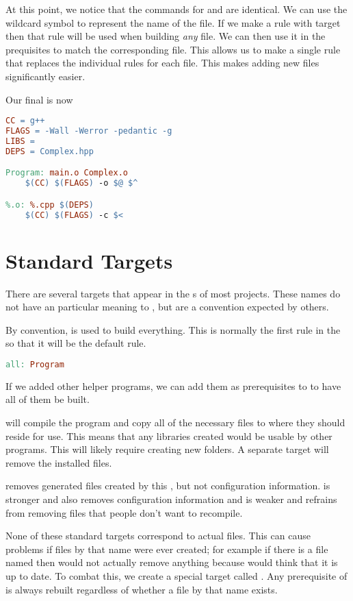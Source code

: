 At this point, we notice that the commands for  and  are identical.
We can use the wildcard symbol \code{\%} to represent the name of the file.
If we make a rule with target  then that rule will be used when building \emph{any}  file.
We can then use it in the prequisites to match the corresponding  file.
This allows us to make a single rule that replaces the individual rules for each  file.
This makes adding new files significantly easier.

Our final  is now
\begin{lstlisting}[language=make]
CC = g++
FLAGS = -Wall -Werror -pedantic -g
LIBS = 
DEPS = Complex.hpp

Program: main.o Complex.o
	$(CC) $(FLAGS) -o $@ $^

%.o: %.cpp $(DEPS)
	$(CC) $(FLAGS) -c $<
\end{lstlisting}


\section{Standard Targets}\label{sec:makefile-phony}

There are several targets that appear in the s of most projects.
These names do not have an particular meaning to , but are a convention expected by others.

By convention,  is used to build everything.
This is normally the first rule in the  so that it will be the default rule.
\begin{lstlisting}[language=make]
all: Program
\end{lstlisting}
If we added other helper programs, we can add them as prerequisites to  to have all of them be built.

 will compile the program and copy all of the necessary files to where they should reside for use.
This means that any libraries created would be usable by other programs.
This will likely require creating new folders.
A separate  target will remove the installed files.

 removes generated files created by this , but not configuration information.
 is stronger and also removes configuration information and  is weaker and refrains from removing files that people don't want to recompile.

None of these standard targets correspond to actual files.
This can cause problems if files by that name were ever created;
for example if there is a file named  then  would not actually remove anything because  would think that it is up to date.
To combat this, we create a special target called .
Any prerequisite of  is always rebuilt regardless of whether a file by that name exists.

